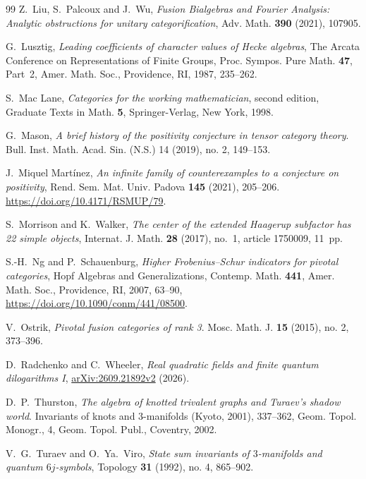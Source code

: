 \documentclass{amsart}
\begin{document}
\begin{thebibliography}{99}
{\sc Z.~Liu, S.~Palcoux and J.~Wu}, {\em Fusion Bialgebras and Fourier Analysis: Analytic obstructions for unitary categorification}, Adv. Math. \textbf{390} (2021), 107905.

{\sc G.~Lusztig},
{\em Leading coefficients of character values of Hecke algebras},
The Arcata Conference on Representations of Finite Groups,
Proc. Sympos. Pure Math. \textbf{47}, Part~2,
Amer. Math. Soc., Providence, RI, 1987, 235--262.

{\sc S.~Mac Lane},
{\em Categories for the working mathematician}, second edition,
Graduate Texts in Math. \textbf{5}, Springer-Verlag, New York, 1998.

{\sc G.~Mason}, {\em A brief history of the positivity conjecture in tensor category theory}. Bull. Inst. Math. Acad. Sin. (N.S.) 14 (2019), no. 2, 149--153.

{\sc J.~Miquel Mart\'inez}, {\em An infinite family of counterexamples to a conjecture on positivity}, Rend. Sem. Mat. Univ. Padova \textbf{145} (2021), 205--206. \url{https://doi.org/10.4171/RSMUP/79}.

{\sc S.~Morrison and K.~Walker},
{\em The center of the extended Haagerup subfactor has 22 simple objects},
Internat. J. Math. \textbf{28} (2017), no.~1, article 1750009, 11~pp.

{\sc S.-H.~Ng and P.~Schauenburg},
{\em Higher Frobenius--Schur indicators for pivotal categories},
Hopf Algebras and Generalizations, Contemp. Math. \textbf{441},
Amer. Math. Soc., Providence, RI, 2007, 63--90,
\url{https://doi.org/10.1090/conm/441/08500}.

{\sc V.~Ostrik}, {\em Pivotal fusion categories of rank 3}. Mosc. Math. J. \textbf{15} (2015), no. 2, 373--396.

{\sc D.~Radchenko and C.~Wheeler},
{\em Real quadratic fields and finite quantum dilogarithms I},
\href{https://arxiv.org/abs/2609.21892v2}{arXiv:2609.21892v2} (2026).

{\sc D.~P.~Thurston}, {\em The algebra of knotted trivalent graphs and Turaev's shadow world}. Invariants of knots and 3-manifolds (Kyoto, 2001), 337--362, Geom. Topol. Monogr., 4, Geom. Topol. Publ., Coventry, 2002.

{\sc V.~G.~Turaev and O.~Ya.~Viro}, {\em State sum invariants of $3$-manifolds and quantum $6j$-symbols}, Topology \textbf{31} (1992), no. 4, 865--902.


\end{thebibliography}
\end{document}
